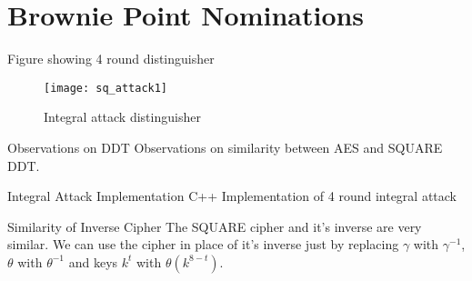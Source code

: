 \section{Brownie Point Nominations}

\begin{frame}{Figure showing 4 round distinguisher}
  \begin{figure}
    \centering
    \texttt{[image: sq\_attack1]}
    \caption{Integral attack distinguisher}
  \end{figure}
\end{frame}

\begin{frame}{Observations on DDT}
  Observations on similarity between AES and SQUARE DDT.
\end{frame}

\begin{frame}{Integral Attack Implementation}
  C++ Implementation of 4 round integral attack
\end{frame}

\begin{frame}{Similarity of Inverse Cipher}
  The SQUARE cipher and it's inverse are very similar. We can use the cipher in place of it's inverse just by replacing $\gamma$ with $\gamma^{-1}$, $\theta$ with $\theta^{-1}$ and keys $k^t$ with $\theta(k^{8-t})$.
\end{frame}